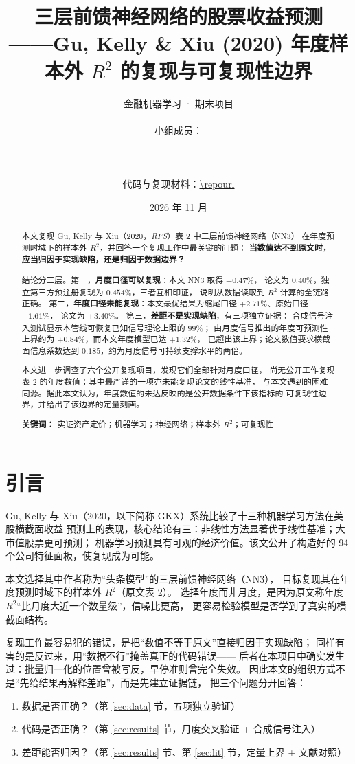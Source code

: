 \documentclass[11pt,a4paper,fontset=windows]{ctexart}
\title{\bfseries 三层前馈神经网络的股票收益预测\\[2pt]
\large ——Gu, Kelly \& Xiu (2020) 年度样本外 $R^2$ 的复现与可复现性边界}
\author{金融机器学习 · 期末项目\\[6pt]
\begin{tabular}{ll}
小组成员： & \underline{\hspace{4cm}} \\[2pt]
  & \underline{\hspace{4cm}} \\[2pt]
  & \underline{\hspace{4cm}} \\
\end{tabular}\\[10pt]
\normalsize 代码与复现材料：\url{\repourl}}
\date{2026 年 11 月}
\begin{document}
\maketitle

\begin{abstract}
\sloppy
\noindent
本文复现 Gu, Kelly 与 Xiu（2020，\emph{RFS}）表 2 中三层前馈神经网络（NN3）
在年度预测时域下的样本外 $R^2$，并回答一个复现工作中最关键的问题：
\textbf{当数值达不到原文时，应当归因于实现缺陷，还是归因于数据边界？}

结论分三层。第一，\textbf{月度口径可以复现}：本文 NN3 取得 $+0.47\%$，
论文为 $0.40\%$，独立第三方预注册复现为 $0.454\%$，三者互相印证，
说明从数据读取到 $R^2$ 计算的全链路正确。
第二，\textbf{年度口径未能复现}：本文最优结果为缩尾口径 $+2.71\%$、原始口径 $+1.61\%$，
论文为 $+3.40\%$。
第三，\textbf{差距不是实现缺陷}，有三项独立证据：
合成信号注入测试显示本管线可恢复已知信号理论上限的 $99\%$；
由月度信号推出的年度可预测性上界约为 $+0.84\%$，而本文年度模型已达 $+1.32\%$，
已超出该上界；论文数值要求横截面信息系数达到 $0.185$，约为月度信号可持续支撑水平的两倍。

本文进一步调查了六个公开复现项目，发现它们全部针对月度口径，
尚无公开工作复现表 2 的年度数值；其中最严谨的一项亦未能复现论文的线性基准，
与本文遇到的困难同源。据此本文认为，年度数值的未达反映的是公开数据条件下该指标的
可复现性边界，并给出了该边界的定量刻画。

\vspace{6pt}
\noindent\textbf{关键词：} 实证资产定价；机器学习；神经网络；样本外 $R^2$；可复现性
\end{abstract}

\section{引言}

Gu, Kelly 与 Xiu（2020，以下简称 GKX）系统比较了十三种机器学习方法在美股横截面收益
预测上的表现，核心结论有三：非线性方法显著优于线性基准；大市值股票更可预测；
机器学习预测具有可观的经济价值。该文公开了构造好的 94 个公司特征面板，使复现成为可能。

本文选择其中作者称为``头条模型''的三层前馈神经网络（NN3），
目标复现其在年度预测时域下的样本外 $R^2$（原文表 2）。
选择年度而非月度，是因为原文称年度 $R^2$``比月度大近一个数量级''，信噪比更高，
更容易检验模型是否学到了真实的横截面结构。

复现工作最容易犯的错误，是把``数值不等于原文''直接归因于实现缺陷；
同样有害的是反过来，用``数据不行''掩盖真正的代码错误——
后者在本项目中确实发生过：批量归一化的位置曾被写反，早停准则曾完全失效。
因此本文的组织方式不是``先给结果再解释差距''，而是先建立证据链，
把三个问题分开回答：
\begin{enumerate}
  \item 数据是否正确？（第 \ref{sec:data} 节，五项独立验证）
  \item 代码是否正确？（第 \ref{sec:results} 节，月度交叉验证 + 合成信号注入）
  \item 差距能否归因？（第 \ref{sec:results} 节、第 \ref{sec:lit} 节，定量上界 + 文献对照）
\end{enumerate}
\end{document}

